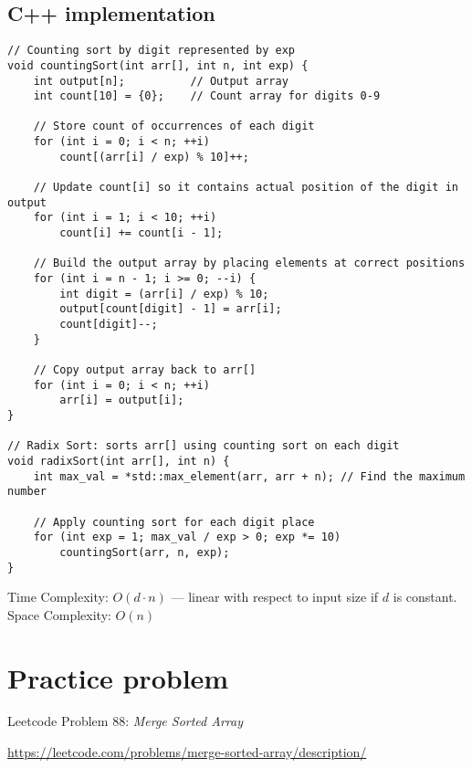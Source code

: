 \documentclass{article}
\begin{document}
\subsection{C++ implementation}

\begin{lstlisting}[style=cppstyle]
// Counting sort by digit represented by exp
void countingSort(int arr[], int n, int exp) {
    int output[n];          // Output array
    int count[10] = {0};    // Count array for digits 0-9

    // Store count of occurrences of each digit
    for (int i = 0; i < n; ++i)
        count[(arr[i] / exp) % 10]++;

    // Update count[i] so it contains actual position of the digit in output
    for (int i = 1; i < 10; ++i)
        count[i] += count[i - 1];

    // Build the output array by placing elements at correct positions
    for (int i = n - 1; i >= 0; --i) {
        int digit = (arr[i] / exp) % 10;
        output[count[digit] - 1] = arr[i];
        count[digit]--;
    }

    // Copy output array back to arr[]
    for (int i = 0; i < n; ++i)
        arr[i] = output[i];
}

// Radix Sort: sorts arr[] using counting sort on each digit
void radixSort(int arr[], int n) {
    int max_val = *std::max_element(arr, arr + n); // Find the maximum number

    // Apply counting sort for each digit place
    for (int exp = 1; max_val / exp > 0; exp *= 10)
        countingSort(arr, n, exp);
}
\end{lstlisting}



 Time Complexity: $O(d \cdot n)$ — linear with respect to input size if $d$ is constant. \\
 Space Complexity: $O(n)$ 

\section{Practice problem}
Leetcode Problem 88: \textit{Merge Sorted Array}

\url{https://leetcode.com/problems/merge-sorted-array/description/}
\end{document}
